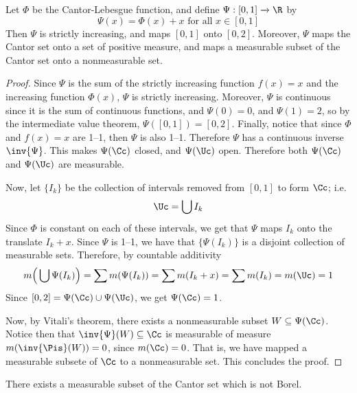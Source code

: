 \begin{lemma}\label{8.7.3}
    Let $\Phi$ be the Cantor-Lebesgue function, and define $\Psi:[0,1]
    \xrightarrow{} \R$ by
    \begin{equation*}
        \Psi(x)=\Phi(x)+x \text{ for all } x \in [0,1]
    \end{equation*}
    Then $\Psi$ is strictly increasing, and maps $[0,1]$ onto $[0,2]$. Moreover,
    $\Psi$ maps the Cantor set onto a set of positive measure, and maps a
    measurable subset of the Cantor set onto a nonmeasurable set.
\end{lemma}
\begin{proof}
    Since $\Psi$ is the sum of the strictly increasing function $f(x)=x$ and the
    increasing function $\Phi(x)$, $\Psi$ is strictly increasing. Moreover,
    $\Psi$ is continuous since it is the sum of continuous functions, and
    $\Psi(0)=0$, and $\Psi(1)=2$, so by the intermediate value theorem,
    $\Psi([0,1])=[0,2]$. Finally, notice that since $\Phi$ and $f(x)=x$ are
    1--1, then $\Psi$ is also 1--1. Therefore  $\Psi$ has a continuous inverse
    $\inv{\Psi}$. This makes $\Psi(\Cc)$ closed, and $\Psi(\Uc)$ open. Therefore
    both $\Psi(\Cc)$ and $\Psi(\Uc)$ are measurable.

    Now, let $\{I_k\}$ be the collection of intervals removed from $[0,1]$ to
    form $\Cc$; i.e.
    \begin{equation*}
        \Uc=\bigcup{I_k}
    \end{equation*}
    Since $\Phi$ is constant on each of these intervals, we get that  $\Psi$
    maps  $I_k$ onto the translate  $I_k+x$. Since $\Psi$ is 1--1, we have that
    $\{\Psi(I_k)\}$ is a disjoint collection of measurable sets. Therefore, by
    countable additivity
    \begin{equation*}
        m\Big{(} \bigcup{\Psi(I_k)} \Big{)}=\sum{m(\Psi(I_k))}=
        \sum{m(I_k+x)}=\sum{m(I_k)}=m(\Uc)=1
    \end{equation*}
    Since $[0,2]=\Psi(\Cc) \cup \Psi(\Uc)$, we get $\Psi(\Cc)=1$.

    Now, by Vitali's theorem, there exists a nonmeasurable subset $W \subseteq
    \Psi(\Cc)$. Notice then that $\inv{\Psi}(W) \subseteq \Cc$ is measurable of
    measure $m(\inv{\Pis}(W))=0$, since $m(\Cc)=0$. That is, we have mapped a
    measurable subsete of $\Cc$ to a nonmeasurable set. This concludes the
    proof.
\end{proof}

\begin{theorem}\label{8.7.4}
    There exists a measurable subset of the Cantor set which is not Borel.
\end{theorem}
